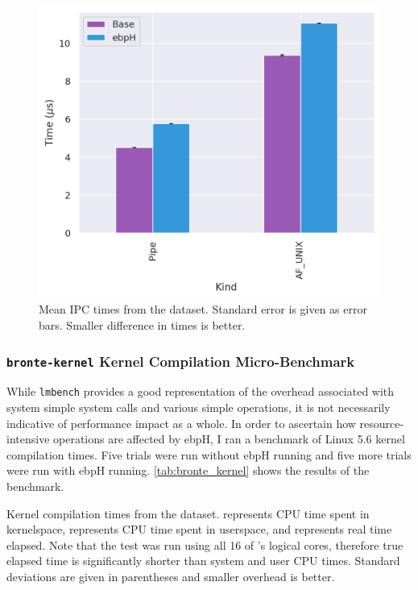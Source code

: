 \documentclass[
  12pt]{findlay}
\newcommand{\passthrough}[1]{#1}
\begin{document}
\begin{figure}
    \caption[Mean IPC times from the  dataset]{
        Mean IPC times from the  dataset.
        Standard error is given as error bars.
        Smaller difference in times is better.
    }
    \label{bronte_lmbench_ipc_graph}
    \includegraphics[width=.8\textwidth]{../data/bench/bronte-lmbench/ipc_times.png}
\end{figure}

\FloatBarrier

\hypertarget{bronte-kernel-kernel-compilation-micro-benchmark}{%
\subsubsection{\texorpdfstring{\texttt{bronte-kernel} Kernel Compilation
Micro-Benchmark}{bronte-kernel Kernel Compilation Micro-Benchmark}}\label{bronte-kernel-kernel-compilation-micro-benchmark}}

\label{bronte_kernel}

While \passthrough{\lstinline!lmbench!} provides a good representation
of the overhead associated with system simple system calls and various
simple operations, it is not necessarily indicative of performance
impact as a whole. In order to ascertain how resource-intensive
operations are affected by ebpH, I ran a benchmark of Linux 5.6 kernel
compilation times. Five trials were run without ebpH running and five
more trials were run with ebpH running. \autoref{tab:bronte_kernel}
shows the results of the benchmark.

\begin{table}
    \caption[Kernel compilation times from the  dataset]{
        Kernel compilation times from the  dataset.
         represents CPU time spent in kernelspace, 
        represents CPU time spent in userspace, and  represents real
        time elapsed. Note that the test was run using all 16 of 's logical cores,
        therefore true elapsed time is significantly shorter than system and user CPU times.
        Standard deviations are given in parentheses and smaller overhead is better.
    }
    \label{tab:bronte_kernel}
    
\end{table}
\end{document}
